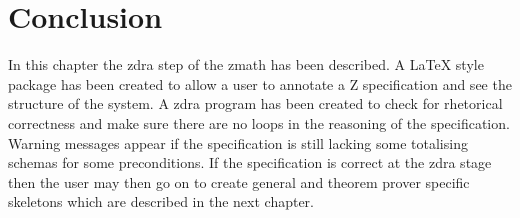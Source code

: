 \section{Conclusion}
In this chapter the \gls{zdra} step of the \gls{zmath} has been described. A \LaTeX{} style package has been created to allow a user to annotate a Z specification and see the structure of the system. A \gls{zdra} program has been created to check for rhetorical correctness and make sure there are no loops in the reasoning of the specification. Warning messages appear if the specification is still lacking some totalising schemas for some preconditions. If the specification is correct at the \gls{zdra} stage then the user may then go on to create general and theorem prover specific skeletons which are described in the next chapter.